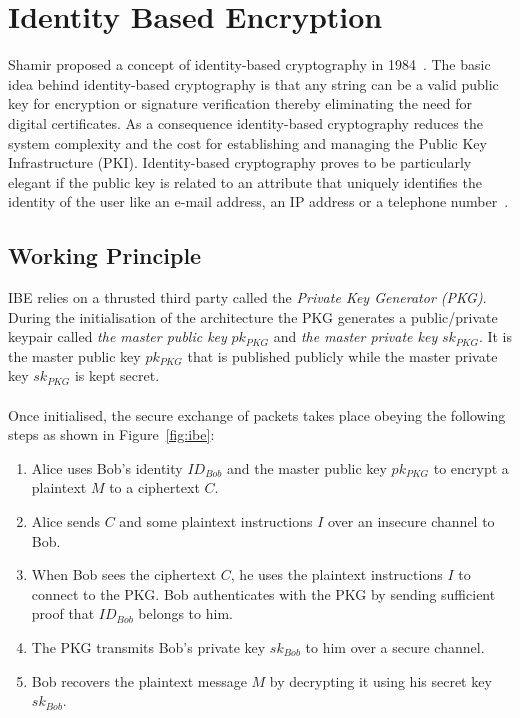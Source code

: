 \documentclass[journal]{IEEEtran}
\begin{document}
\section{Identity Based Encryption}\label{sec:ibe}
Shamir proposed a concept of identity-based cryptography in
1984~\cite{DBLP:conf/crypto/Shamir84}. The basic idea behind identity-based
cryptography is that any string can be a valid public key for encryption or
signature verification thereby eliminating the need for digital certificates.
As a consequence identity-based cryptography reduces the system
complexity and the cost for establishing and managing the Public
Key Infrastructure (PKI). Identity-based cryptography proves to be particularly
elegant if the public key is related to an attribute that uniquely identifies
the identity of the user like an e-mail address, an IP address or a telephone
number~\cite{Baek04asurvey}.

\subsection{Working Principle~\cite{YoungbloodIntroduction}}
IBE relies on a thrusted third party called the \textit{Private Key Generator
(PKG)}. During the initialisation of the architecture the PKG generates a
public/private keypair called \textit{the master public key} $pk_{PKG}$ and
\textit{the master private key} $sk_{PKG}$. It is the master public key
$pk_{PKG}$ that is published publicly while the master private key $sk_{PKG}$
is kept secret.\\
\\
Once initialised, the secure exchange of packets takes place obeying the
following steps as shown in Figure~\ref{fig:ibe}:

\begin{enumerate}
 \item Alice uses Bob's identity $ID_{Bob}$ and the master public key $pk_{PKG}$
to encrypt a plaintext $M$ to a ciphertext $C$.
 \item Alice sends $C$ and some plaintext instructions $I$ over an insecure
channel to Bob.
 \item When Bob sees the ciphertext $C$, he uses the plaintext instructions $I$
to connect to the PKG. Bob authenticates with the PKG by sending sufficient
proof that $ID_{Bob}$ belongs to him.
 \item The PKG transmits Bob's private key $sk_{Bob}$ to him over a secure
channel.
 \item Bob recovers the plaintext message $M$ by decrypting it using his secret
key $sk_{Bob}$.
\end{enumerate}
\end{document}
